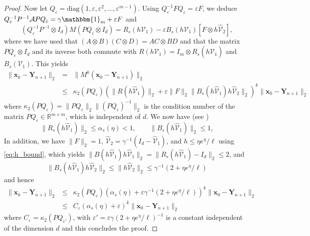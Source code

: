 \documentclass[10pt,a4paper]{article}
\newcommand{\R}{\mathbb{R}}
\def \calA{\mathcal{A}}
\renewcommand{\R}{\mathbb{R}}
\begin{document}
\begin{proof}
Now let $Q_\varepsilon=\mathrm{diag}(1,\varepsilon,\varepsilon^2,\ldots, \varepsilon^{m-1})$.
Using 
		$
		Q_\varepsilon^{-1} F Q_\varepsilon = \varepsilon F
		$,
we deduce
$
Q_\varepsilon^{-1}P^{-1} \calA PQ_\varepsilon =  \gamma \mathbbm{1}_m +  \varepsilon F
$
and
$$
(Q_\varepsilon^{-1}P^{-1}\otimes I_d) M (PQ_\varepsilon\otimes I_d) =  R_s(h\mathcal{V}_1) - \varepsilon   B_s(h\mathcal{V}_1) [F \otimes h\hat{\mathcal{V}}_{2}],
$$
where we have used that $(A \otimes B)(C \otimes D)=AC \otimes BD$ and that the matrix $PQ_\varepsilon\otimes I_d$ and its inverse both commute with $R(h\mathcal{V}_1)=I_m \otimes R_s(h\hat{\mathcal{V}}_{1})$ and $B_s(\mathcal{V}_1)$. This yields
\begin{eqnarray}
\|\boldsymbol{x}_k-\boldsymbol{Y}_{n+1}\|_2 &=& \|M^k(\boldsymbol{x}_0-\boldsymbol{Y}_{n+1})\|_2 \nonumber \\
&\leq& \kappa_2(PQ_\varepsilon)
(\|R(h\hat{\mathcal{V}}_{1})\|_2 + \varepsilon \|F\|_2 \|B_{s}(h\hat{\mathcal{V}}_{1})h\hat{\mathcal{V}}_{2}\|_2)^k \|\boldsymbol{x}_0-\boldsymbol{Y}_{n+1}\|_2
\end{eqnarray}
where $\kappa_2(PQ_\varepsilon)=\|PQ_\varepsilon\|_2\|(PQ_\varepsilon)^{-1}\|_2$ is the condition number of the matrix $PQ_\varepsilon\in\R^{m\times m}$, which is independent of $d$.
{ We now have (see \cite[Lemma A.1]{EVVZ21})
\begin{equation} \label{eq:RBone}
\|R_{s}(h\hat{\mathcal{V}}_1)\|_2 \leq \alpha_s(\eta)<1,\qquad \|B_{s}(h\hat{\mathcal{V}}_1)\|_2 \leq 1, 
\end{equation}
In addition, we have   $\|F\|_2 = 1$, 
 $\hat{\mathcal{V}}_2=\gamma^{-1}(I_d -\hat{\mathcal{V}}_1)$,
and $h\leq\eta e^\eta/\ell$ using \eqref{eq:h_bound},
which yields $\|B(h\hat{\mathcal{V}}_1)h\hat{\mathcal{V}}_1\|_2 = \|R_s(h\hat{\mathcal{V}}_1) -I_d\|_2 \leq 2$, and 
\begin{equation} \label{eq:us_bound}
\|B_s(h\hat{\mathcal{V}}_1)h \hat{\mathcal{V}}_2\|_2 \leq  \|h \hat{\mathcal{V}}_2\|_2 \leq\gamma^{-1}(2  + \eta e^\eta/\ell )
\end{equation}
}
and hence
\begin{eqnarray*}
\|\boldsymbol{x}_k-\boldsymbol{Y}_{n+1}\|_2 &\leq& \kappa_2(PQ_\varepsilon)
(\alpha_s(\eta) + \varepsilon \gamma^{-1}(2  + \eta e^\eta/\ell ))^k \|\boldsymbol{x}_0-\boldsymbol{Y}_{n+1}\|_2 \\
&\leq&C_\varepsilon
(\alpha_s(\eta) + \varepsilon)^k \|\boldsymbol{x}_0-\boldsymbol{Y}_{n+1}\|_2 
\end{eqnarray*}
where $C_\varepsilon = \kappa_2(PQ_{\varepsilon'})$,
with
$\varepsilon' = \varepsilon\gamma(2  + \eta e^\eta/\ell )^{-1} $ is a constant independent of the dimension $d$
and this concludes the proof.
\end{proof}
\end{document}
